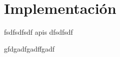 \vspace*{-1cm}
\section{Implementación}
\label{sec:implementacion}



fsdfsdfsdf \glspl{api} dfsdfsdf 

gfdgadfgadffgadf \cite{android_developers_architectures}

\lipsum[1-10]
